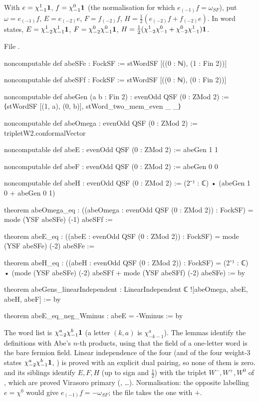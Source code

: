 \begin{definition}\label{l18:def:abegens}
With $e=\chi^1_{-1}\mathbf{1}$, $f=\chi^0_{-1}\mathbf{1}$ (the normalisation for which $e_{(-1)}f=\omega_{SF}$),
put $\omega=e_{(-1)}f$, $E=e_{(-2)}e$, $F=f_{(-2)}f$, $H=\frac12(e_{(-2)}f+f_{(-2)}e)$. In word states,
$E=\chi^1_{-2}\chi^1_{-1}\mathbf{1}$, $F=\chi^0_{-2}\chi^0_{-1}\mathbf{1}$, $H=\frac12(\chi^1_{-2}\chi^0_{-1}+\chi^0_{-2}\chi^1_{-1})\mathbf{1}$.
\end{definition}
\noindent File .
\begin{leancode}
noncomputable def abeSFe : FockSF := stWordSF [((0 : ℕ), (1 : Fin 2))]

noncomputable def abeSFf : FockSF := stWordSF [((0 : ℕ), (0 : Fin 2))]

noncomputable def abeGen (a b : Fin 2) : evenOdd QSF (0 : ZMod 2) :=
  ⟨stWordSF [(1, a), (0, b)], stWord_two_mem_even _ _⟩

noncomputable def abeOmega : evenOdd QSF (0 : ZMod 2) := tripletW2.conformalVector

noncomputable def abeE : evenOdd QSF (0 : ZMod 2) := abeGen 1 1

noncomputable def abeF : evenOdd QSF (0 : ZMod 2) := abeGen 0 0

noncomputable def abeH : evenOdd QSF (0 : ZMod 2) :=
  (2⁻¹ : ℂ) • (abeGen 1 0 + abeGen 0 1)
\end{leancode}
\begin{leancode}
theorem abeOmega_eq :
    ((abeOmega : evenOdd QSF (0 : ZMod 2)) : FockSF) = mode (YSF abeSFe) (-1) abeSFf :=

theorem abeE_eq :
    ((abeE : evenOdd QSF (0 : ZMod 2)) : FockSF) = mode (YSF abeSFe) (-2) abeSFe :=

theorem abeH_eq :
    ((abeH : evenOdd QSF (0 : ZMod 2)) : FockSF)
      = (2⁻¹ : ℂ) • (mode (YSF abeSFe) (-2) abeSFf + mode (YSF abeSFf) (-2) abeSFe) := by

theorem abeGens_linearIndependent :
    LinearIndependent ℂ ![abeOmega, abeE, abeH, abeF] := by

theorem abeE_eq_neg_Wminus : abeE = -Wminus := by
\end{leancode}
\begin{dictionary}
The word list \lean{[(1, a), (0, b)]} is $\chi^a_{-2}\chi^b_{-1}\mathbf{1}$ (a letter $(k,a)$ is $\chi^a_{-k-1}$).
The  lemmas identify the definitions with Abe's $n$-th products, using that the field of a
one-letter word is the bare fermion field. Linear independence of the four (and of the four weight-3 states
$\chi^a_{-2}\chi^b_{-1}\mathbf{1}$, ) is proved with an explicit dual pairing, so
none of them is zero.  and its siblings identify $E,F,H$ (up to sign and $\frac12$)
with the triplet $W^-,W^+,W^0$ of , which are proved Virasoro primary
(, \dots). Normalisation: the opposite labelling $e=\chi^0$ would give
$e_{(-1)}f=-\omega_{SF}$; the file takes the one with $+$.
\end{dictionary}
